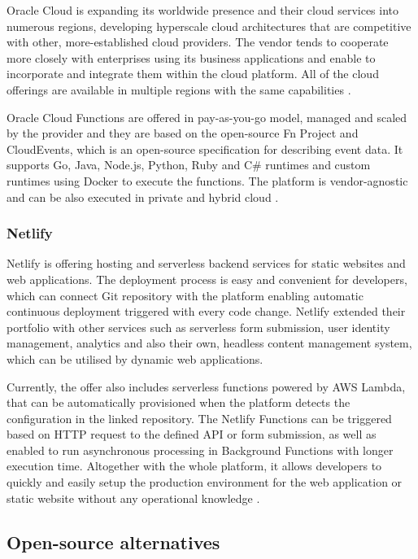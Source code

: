 Oracle Cloud is expanding its worldwide presence and their cloud services into numerous regions, developing hyperscale cloud architectures that are competitive with other, more-established cloud providers. The vendor tends to cooperate more closely with enterprises using its business applications and enable to incorporate and integrate them within the cloud platform. All of the cloud offerings are available in multiple regions with the same capabilities \cite{Gartner}.

Oracle Cloud Functions are offered in pay-as-you-go model, managed and scaled by the provider and they are based on the open-source Fn Project and CloudEvents, which is an open-source specification for describing event data. It supports Go, Java, Node.js, Python, Ruby and C\# runtimes and custom runtimes using Docker to execute the functions. The platform is vendor-agnostic and can be also executed in private and hybrid cloud \cite{FnProject}.

\subsubsection{Netlify}

Netlify is offering hosting and serverless backend services for static websites and web applications. The deployment process is easy and convenient for developers, which can connect Git repository with the platform enabling automatic continuous deployment triggered with every code change. Netlify extended their portfolio with other services such as serverless form submission, user identity management, analytics and also their own, headless content management system, which can be utilised by dynamic web applications.

Currently, the offer also includes serverless functions powered by AWS Lambda, that can be automatically provisioned when the platform detects the configuration in the linked repository. The Netlify Functions can be triggered based on HTTP request to the defined API or form submission, as well as enabled to run asynchronous processing in Background Functions with longer execution time. Altogether with the whole platform, it allows developers to quickly and easily setup the production environment for the web application or static website without any operational knowledge \cite{NetlifyFunction}.

\subsection{Open-source alternatives}


